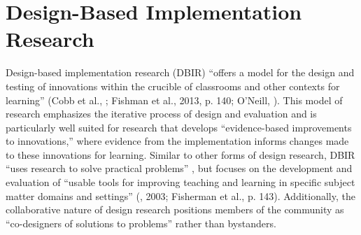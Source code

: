 \documentclass[12pt]{article}
\begin{document}

\section{Design-Based Implementation Research} 

\quad Design-based implementation research (DBIR) ``offers a model for the 
design and testing of innovations within the crucible of classrooms and other 
contexts for learning'' (Cobb et al., \citeyear{confrey}; Fishman et al., 2013, 
p. 140; O'Neill, \citeyear{oneill}). This model of research emphasizes the 
iterative process of design and evaluation and is particularly well suited for 
research that develops ``evidence-based improvements to innovations,'' where 
evidence from the implementation informs changes made to these innovations for 
learning. Similar to other forms of design research, DBIR ``uses research to 
solve practical problems'' \citep[p. 143]{penuel}, but focuses on the 
development and evaluation of ``usable tools for improving teaching and learning
in specific subject matter domains and settings'' (\citeauthor{confrey}, 2003;
Fisherman et al., p. 143). Additionally, the collaborative nature of design 
research positions members of the community as ``co-designers of solutions to 
problems'' \citep[p. 140]{penuel} rather than bystanders. 

\end{document}
